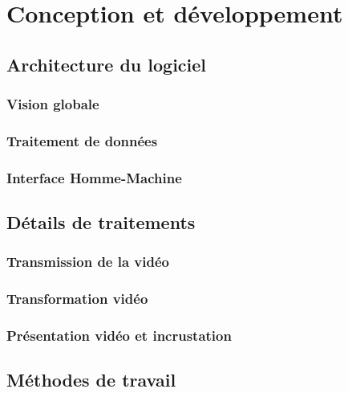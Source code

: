\chapter{Conception et développement}

	\section{Architecture du logiciel}

		\subsection{Vision globale}
			

		\subsection{Traitement de données}

			
		\subsection{Interface Homme-Machine}
		

	\section{Détails de traitements}
	
		\subsection{Transmission de la vidéo}
		
			
		\subsection{Transformation vidéo}
		
			
		\subsection{Présentation vidéo et incrustation}
		
			
	\section{Méthodes de travail}

